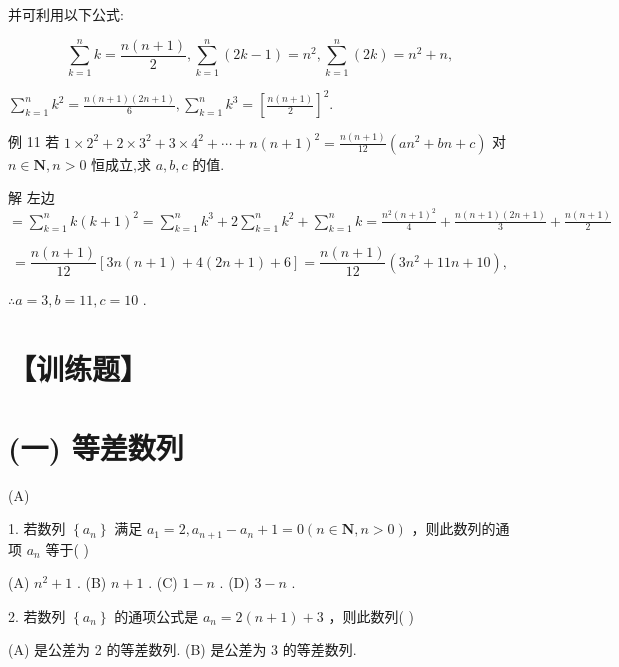 \documentclass[10pt]{article}
\begin{document}
并可利用以下公式:

\[
\mathop{\sum }\limits_{{k = 1}}^{n}k = \frac{n\left( {n + 1}\right) }{2},\mathop{\sum }\limits_{{k = 1}}^{n}\left( {{2k} - 1}\right)  = {n}^{2},\mathop{\sum }\limits_{{k = 1}}^{n}\left( {2k}\right)  = {n}^{2} + n,
\]

\(\mathop{\sum }\limits_{{k = 1}}^{n}{k}^{2} = \frac{n\left( {n + 1}\right) \left( {{2n} + 1}\right) }{6},\mathop{\sum }\limits_{{k = 1}}^{n}{k}^{3} = {\left\lbrack  \frac{n\left( {n + 1}\right) }{2}\right\rbrack  }^{2}.\)

例 11 若 \(1 \times  {2}^{2} + 2 \times  {3}^{2} + 3 \times  {4}^{2} + \cdots  + n{\left( n + 1\right) }^{2} = \frac{n\left( {n + 1}\right) }{12}\left( {a{n}^{2} + {bn} + c}\right)\) 对 \(n \in  \mathbf{N},n > 0\) 恒成立,求 \(a,b,c\) 的值.

解 左边 \(= \mathop{\sum }\limits_{{k = 1}}^{n}k{\left( k + 1\right) }^{2} = \mathop{\sum }\limits_{{k = 1}}^{n}{k}^{3} + 2\mathop{\sum }\limits_{{k = 1}}^{n}{k}^{2} + \mathop{\sum }\limits_{{k = 1}}^{n}k = \frac{{n}^{2}{\left( n + 1\right) }^{2}}{4} + \frac{n\left( {n + 1}\right) \left( {{2n} + 1}\right) }{3} + \frac{n\left( {n + 1}\right) }{2}\)

\[
= \frac{n\left( {n + 1}\right) }{12}\left\lbrack  {{3n}\left( {n + 1}\right)  + 4\left( {{2n} + 1}\right)  + 6}\right\rbrack   = \frac{n\left( {n + 1}\right) }{12}\left( {3{n}^{2} + {11n} + {10}}\right) ,
\]

\(\therefore a = 3,b = {11},c = {10}\) .

\section*{【训练题】}

\section*{(一) 等差数列}

(A)

1. 若数列 \(\left\{  {a}_{n}\right\}\) 满足 \({a}_{1} = 2,{a}_{n + 1} - {a}_{n} + 1 = 0\left( {n \in  \mathbf{N},n > 0}\right)\) ，则此数列的通项 \({a}_{n}\) 等于( )

(A) \({n}^{2} + 1\) . (B) \(n + 1\) . (C) \(1 - n\) . (D) \(3 - n\) .

2. 若数列 \(\left\{  {a}_{n}\right\}\) 的通项公式是 \({a}_{n} = 2\left( {n + 1}\right)  + 3\) ，则此数列( )

(A) 是公差为 2 的等差数列. (B) 是公差为 3 的等差数列.
\end{document}

